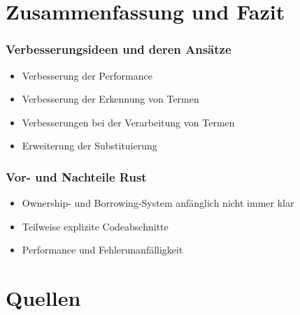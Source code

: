 \documentclass{beamer}
\begin{document}
\section{Zusammenfassung und Fazit}
\begin{frame}[fragile]
  \frametitle{Verbesserungsideen und deren Ansätze}
  \begin{itemize}
    \item Verbesserung der Performance
    \pause
    \item Verbesserung der Erkennung von Termen
    \pause
    \item Verbesserungen bei der Verarbeitung von Termen
    \pause
    \item Erweiterung der Substituierung
  \end{itemize}
\end{frame}

\begin{frame}[fragile]
  \frametitle{Vor- und Nachteile Rust}
  \begin{itemize}
    \item Ownership- und Borrowing-System anfänglich nicht immer klar
    \pause
    \item Teilweise explizite Codeabschnitte
    \pause
    \item Performance und Fehlerunanfälligkeit
  \end{itemize}
\end{frame}

\section{Quellen}
\begin{frame}
  
  \raggedright
  
\end{frame}
\end{document}

